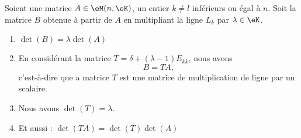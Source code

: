 \begin{proposition} \label{PROPooXUFKooOaPnna}
    Soient une matrice \( A\in \eM(n,\eK)\), un entier \( k\neq l\) inférieurs ou égal à \( n\). Soit la matrice \( B\) obtenue à partir de \( A\) en multipliant la ligne \( L_k\) par \( \lambda\in \eK\).
    \begin{enumerate}
        \item       \label{ITEMooBKIGooCDQEDt}
            \( \det(B)=\lambda\det(A)\)
        \item       \label{ITEMooWRRCooFXkRNW}
            En considérant la matrice \( T=\delta+(\lambda-1)E_{kk}\), nous avons
            \begin{equation}
                B=TA,
            \end{equation}
            c'est-à-dire que a matrice \( T\) est une matrice de multiplication de ligne par un scalaire.
        \item       \label{ITEMooOGGDooPVVRzk}
            Nous avons \( \det(T)=\lambda\).
        \item       \label{ITEMooIFRVooWQYgkK}
            Et aussi : \( \det(TA)=\det(T)\det(A)\)
    \end{enumerate}
\end{proposition}

